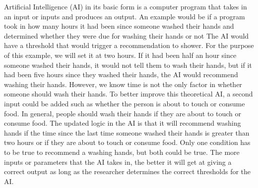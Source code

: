 \documentclass[]{article}
\begin{document}
		Artificial Intelligence (AI) in its basic form is a computer program that takes in an input or inputs and produces an output.  An example would be if a program took in how many hours it had been since someone washed their hands and determined whether they were due for washing their hands or not  The AI would have a threshold that would trigger a recommendation to shower.  For the purpose of this example, we will set it at two hours.  If it had been half an hour since someone washed their hands, it would not tell them to wash their hands, but if it had been five hours since they washed their hands, the AI would recommend washing their hands.  However, we know time is not the only factor in whether someone should wash their hands.  To better improve this theoretical AI, a second input could be added such as whether the person is about to touch or consume food.  In general, people should wash their hands if they are about to touch or consume food.  The updated logic in the AI is that it will recommend washing hands if the time since the last time someone washed their hands is greater than two hours or if they are about to touch or consume food. Only one condition has to be true to recommend a washing hands, but both could be true.  The more inputs or parameters that the AI takes in, the better it will get at giving a correct output as long as the researcher determines the correct thresholds for the AI.
\end{document}
